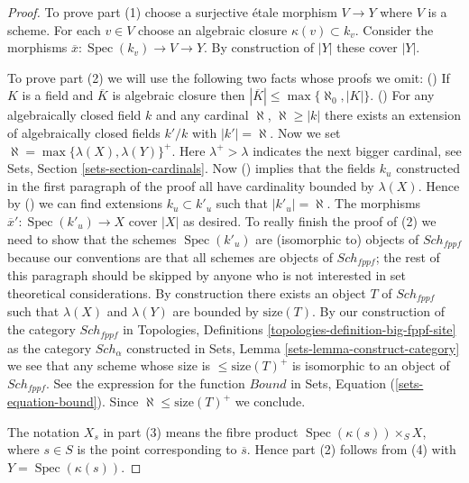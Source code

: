 \documentclass{stacks-project}
\theoremstyle{plain}
\theoremstyle{definition}
\theoremstyle{remark}
\numberwithin{equation}{subsection}
\def\Spec{\mathop{\mathrm{Spec}}}
\def\Sch{\mathit{Sch}}
\begin{document}
\begin{proof}
To prove part (1) choose a surjective \'etale morphism $V \to Y$ where
$V$ is a scheme. For each $v \in V$ choose an algebraic closure
$\kappa(v) \subset k_v$. Consider the morphisms
$\overline{x} : \Spec(k_v) \to V \to Y$.
By construction of $|Y|$ these cover $|Y|$.

\medskip\noindent
To prove part (2) we will use the following two facts whose proofs we omit:
() If $K$ is a field and $\overline{K}$ is algebraic closure then
$|\overline{K}| \leq \max\{\aleph_0, |K|\}$.
() For any algebraically closed field $k$ and any cardinal
$\aleph$, $\aleph \geq |k|$ there exists an extension of algebraically
closed fields $k'/k$ with $|k'| = \aleph$.
Now we set $\aleph = \max\{\lambda(X), \lambda(Y)\}^+$.
Here $\lambda^+ > \lambda$ indicates the next bigger cardinal, see
Sets, Section \ref{sets-section-cardinals}.
Now ()
implies that the fields $k_u$ constructed in the first paragraph
of the proof all have cardinality bounded by $\lambda(X)$. Hence
by () we can find extensions $k_u \subset k'_u$ such that
$|k'_u| = \aleph$. The morphisms
$\overline{x}' : \Spec(k'_u) \to X$ cover $|X|$ as desired.
To really finish the proof of (2) we need to show that the schemes
$\Spec(k'_u)$ are (isomorphic to) objects of $\Sch_{fppf}$
because our conventions are that all schemes are objects of
$\Sch_{fppf}$; the rest of this paragraph should be skipped by
anyone who is not interested in set theoretical considerations. By
construction there exists an object $T$ of $\Sch_{fppf}$ such that
$\lambda(X)$ and $\lambda(Y)$ are bounded by $\text{size}(T)$.
By our construction of the category $\Sch_{fppf}$ in
Topologies, Definitions \ref{topologies-definition-big-fppf-site}
as the category $\Sch_\alpha$ constructed in
Sets, Lemma \ref{sets-lemma-construct-category}
we see that any scheme whose size is $\leq \text{size}(T)^+$
is isomorphic to an object of $\Sch_{fppf}$. See
the expression for the function $Bound$ in
Sets, Equation (\ref{sets-equation-bound}).
Since $\aleph \leq \text{size}(T)^+$ we conclude.

\medskip\noindent
The notation $X_s$ in part (3) means
the fibre product $\Spec(\kappa(s)) \times_S X$, where $s \in S$
is the point corresponding to $\overline{s}$. Hence part (2) follows
from (4) with $Y = \Spec(\kappa(s))$.


\end{proof}
\end{document}
